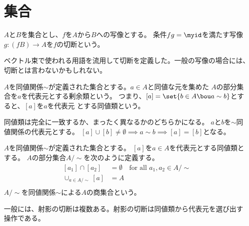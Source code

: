 \section{集合}\label{s1:集合} %
	\begin{definition}[写像の切断]\label{def:写像の切断} %
		$A$と$B$を集合とし、$f$を$A$から$B$への写像とする。
		条件$fg=\myid$を満たす写像$g:(fB)\to A$を$f$の切断という。
	\end{definition} %

	ベクトル束で使われる用語を流用して切断を定義した。一般の写像の場合には、
	切断とは言わないかもしれない。

	\begin{definition}[同値類]\label{def:同値類} %
		$A$を同値関係$\sim$が定義された集合とする。$a\in A$と同値な元を集めた
		$A$の部分集合を$a$を代表元とする剰余類という。
		つまり、$[a]=\set{b\in A\bou a\sim b}$とすると、$[a]$を$a$を代表元
		とする同値類という。
	\end{definition} %

	同値類は完全に一致するか、まったく異なるかのどちらかになる。
	$a$と$b$を$\sim$同値関係の代表元とする。
	$[a]\cup[b]\ne\emptyset \implies a\sim b \implies [a]=[b]$となる。

	\begin{definition}[商集合]\label{def:商集合} %
		$A$を同値関係$\sim$が定義された集合とする。
		$[a]$を$a\in A$を代表元とする同値類とする。
		$A$の部分集合$A/\sim$を次のように定義する。
		\begin{equation}\begin{split} %
			[a_1]\cap [a_2] &= \emptyset \quad\text{for all }a_1,a_2\in A/\sim \\
			\cup_{a\in A/\sim}[a] &= A \\
		\end{split}\end{equation} %
		$A/\sim$を同値関係$\sim$による$A$の商集合という。
	\end{definition} %

	一般には、射影の切断は複数ある。射影の切断は同値類から代表元を選び出す
	操作である。

